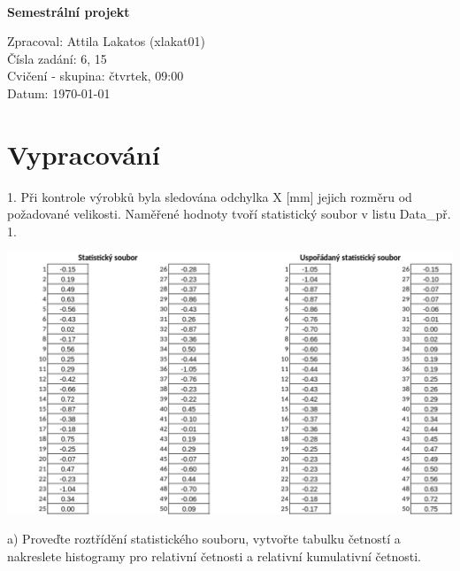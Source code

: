 \documentclass[11pt,a4paper]{article}
\begin{document}
\begin{titlepage}
\begin{center}
        \hfill\\[10mm]

        \LARGE{
            \textbf{
                Semestrální projekt
            }
        }
        \vfill

    \end{center}

        \Large{
            \noindent Zpracoval: Attila Lakatos (xlakat01)\hfill \\
             Čísla zadání: 6, 15 \\
             Cvičení - skupina: čtvrtek, 09:00 \\
             Datum: \today
        }

\end{titlepage}


\newpage



\section{Vypracování}

1. Při kontrole výrobků byla sledována odchylka X [mm] jejich rozměru od požadované velikosti. Naměřené hodnoty tvoří statistický soubor v listu Data\_př. 1.

\vspace{0,5cm}\includegraphics[width=\textwidth]{img/task1.pdf}\vspace{0,5cm}

\noindent\makebox[\linewidth]{\rule{\textwidth}{0.4pt}}

a) Proveďte roztřídění statistického souboru, vytvořte tabulku četností a nakreslete histogramy pro relativní četnosti a relativní kumulativní četnosti.
\vspace{0,5cm}
\end{document}
